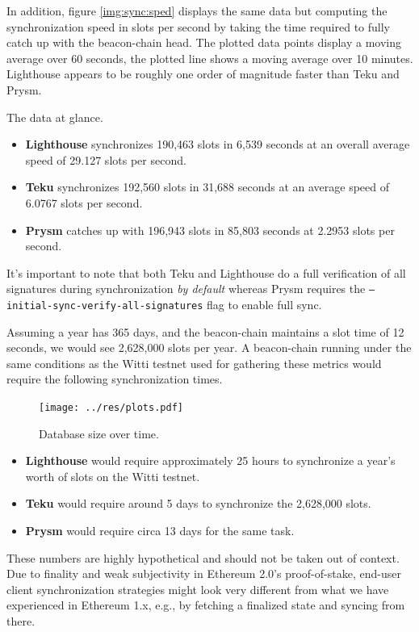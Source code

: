 \documentclass[twoside,twocolumn]{article}
\begin{document}
In addition, figure \ref{img:sync:sped} displays the same data but computing the synchronization speed in slots per second by taking the time required to fully catch up with the beacon-chain head. The plotted data points display a moving average over 60 seconds, the plotted line shows a moving average over 10 minutes. Lighthouse appears to be roughly one order of magnitude faster than Teku and Prysm.\par

The data at glance.
\begin{itemize}
\item \textbf{Lighthouse} synchronizes 190,463 slots in 6,539 seconds at an overall average speed of 29.127 slots per second.
\item \textbf{Teku} synchronizes 192,560 slots in 31,688 seconds at an average speed of 6.0767 slots per second.
\item \textbf{Prysm} catches up with 196,943 slots in 85,803 seconds at 2.2953 slots per second.
\end{itemize}

It's important to note that both Teku and Lighthouse do a full verification of all signatures during synchronization \textit{by default} whereas Prysm requires the \texttt{--initial-sync-verify-all-signatures} flag to enable full sync.\par

Assuming a year has 365 days, and the beacon-chain maintains a slot time of 12 seconds, we would see 2,628,000 slots per year. A beacon-chain running under the same conditions as the Witti testnet used for gathering these metrics would require the following synchronization times.

\begin{figure}[t]
	\centering
	\texttt{[image: ../res/plots.pdf]}
	\caption{Database size over time.}
	\label{img:db}
\end{figure}

\begin{itemize}
\item \textbf{Lighthouse} would require approximately 25 hours to synchronize a year's worth of slots on the Witti testnet.
\item \textbf{Teku} would require around 5 days to synchronize the 2,628,000 slots.
\item \textbf{Prysm} would require circa 13 days for the same task.
\end{itemize}

These numbers are highly hypothetical and should not be taken out of context. Due to finality and weak subjectivity in Ethereum 2.0's proof-of-stake, end-user client synchronization strategies might look very different from what we have experienced in Ethereum 1.x, e.g., by fetching a finalized state and syncing from there.\par
\end{document}
